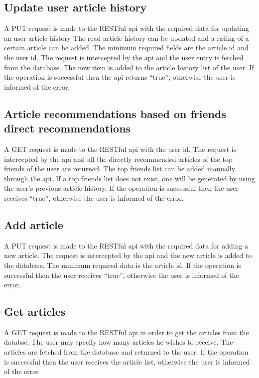 \subsection{Update user article history}
\label{sec:workflow-update-user-article-history}
A PUT request is made to the RESTful api with the required data for updating an user article history
The read article history can be updated and a rating of a certain article can be added. 
The minimum required fields are the article id and the user id.
The request is intercepted by the api and the user entry is fetched from the database. The new item is added to the article history list of the user. If the operation is successful then the api returns “true”, otherwise the user is informed of the error. 

\subsection{Article recommendations based on friends direct recommendations}
\label{sec:workflow-friends-direct-recommendations}
A GET request is made to the RESTful api with the user id.
The request is intercepted by the api and all the directly recommended articles of the top friends of the user are returned.
The top friends list can be added manually through the api.
If a top friends list does not exist, one will be generated by using the user’s previous article history.
If the operation is successful then the user receives “true”, otherwise the user is informed of the error. 

\subsection{Add article}
\label{sec:workflow-add-article}
A PUT request is made to the RESTful api with the required data for adding a new article.
The request is intercepted by the api and the new article is added to the database.
The minimum required data is the article id.
If the operation is successful then the user receives “true”, otherwise the user is informed of the error.


\subsection{Get articles}
\label{sec:workflow-get-all-articles}
A GET request is made to the RESTful api in order to get the articles from the databse.
The user may specify how many articles he wishes to receive.
The articles are fetched from the database and returned to the user.
If the operation is successful then the user receives the article list, otherwise the user is informed of the error

